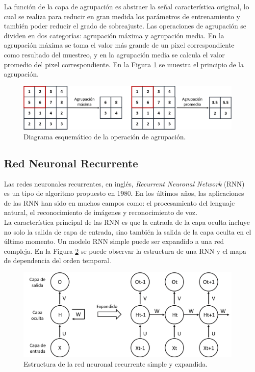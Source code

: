  La función de la capa de agrupación es abstraer la señal característica original, lo cual se realiza para reducir en gran medida los parámetros de entrenamiento y también poder reducir el grado de sobreajuste. Las operaciones de agrupación se dividen en dos categorías: agrupación máxima y agrupación media. En la agrupación máxima se toma el valor más grande de un pixel correspondiente como resultado del muestreo, y en la agrupación media se calcula el valor promedio del pixel correspondiente. En la Figura \ref{fig:Agrupacion} se muestra el principio de la agrupación.

  \begin{figure}[!h]
     \centering
     \includegraphics[width=.7\textwidth]{Imagenes/Agrupamiento.png}
     \caption{Diagrama esquemático de la operación de agrupación.}
     \label{fig:Agrupacion}
 \end{figure}

 \subsection{Red Neuronal Recurrente}

 Las redes neuronales recurrentes, en inglés, \textit{Recurrent Neuronal Network} (RNN) es un tipo de algoritmo propuesto en 1980. En los últimos años, las aplicaciones de las RNN han sido en muchos campos como: el procesamiento del lenguaje natural, el reconocimiento de imágenes y reconocimiento de voz.\\

 La característica principal de las RNN es que la entrada de la capa oculta incluye no solo la salida de capa de entrada, sino también la salida de la capa oculta en el último momento. Un modelo RNN simple puede ser expandido a una red compleja. En la Figura \ref{fig:RNN} se puede observar la estructura de una RNN y el mapa de dependencia del orden temporal.\\

   \begin{figure}[!h]
     \centering
     \includegraphics[width=.7\textwidth]{Imagenes/RNN.png}
     \caption{Estructura de la red neuronal recurrente simple y expandida.}
     \label{fig:RNN}
 \end{figure}

